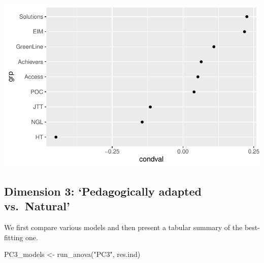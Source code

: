 \documentclass[
  letterpaper,
  DIV=11,
  numbers=noendperiod]{scrreprt}
\newenvironment{Shaded}{\begin{snugshade}}{\end{snugshade}}
\newcommand{\AttributeTok}[1]{\textcolor[rgb]{0.40,0.45,0.13}{#1}}
\newcommand{\CommentTok}[1]{\textcolor[rgb]{0.37,0.37,0.37}{#1}}
\newcommand{\FunctionTok}[1]{\textcolor[rgb]{0.28,0.35,0.67}{#1}}
\newcommand{\NormalTok}[1]{\textcolor[rgb]{0.00,0.23,0.31}{#1}}
\newcommand{\OtherTok}[1]{\textcolor[rgb]{0.00,0.23,0.31}{#1}}
\newcommand{\SpecialCharTok}[1]{\textcolor[rgb]{0.37,0.37,0.37}{#1}}
\newcommand{\StringTok}[1]{\textcolor[rgb]{0.13,0.47,0.30}{#1}}
\begin{document}
\begin{Shaded}
\end{Shaded}

\includegraphics{G_Ch7_Analysis_files/figure-pdf/unnamed-chunk-14-2.pdf}

\subsection{Dimension 3: `Pedagogically adapted
vs.~Natural'}\label{dimension-3-pedagogically-adapted-vs.-natural}

We first compare various models and then present a tabular summary of
the best-fitting one.

\begin{Shaded}
\begin{Highlighting}[]
\NormalTok{PC3\_models }\OtherTok{\textless{}{-}} \FunctionTok{run\_anova}\NormalTok{(}\StringTok{"PC3"}\NormalTok{, res.ind)}
\end{Highlighting}
\end{Shaded}
\end{document}
